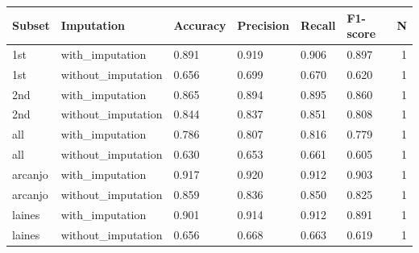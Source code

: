 \begin{tabular}{llllllr}
\toprule
 Subset &         Imputation & Accuracy & Precision & Recall & F1-score &  N \\
\midrule
    1st &    with_imputation &    0.891 &     0.919 &  0.906 &    0.897 &  1 \\
    1st & without_imputation &    0.656 &     0.699 &  0.670 &    0.620 &  1 \\
    2nd &    with_imputation &    0.865 &     0.894 &  0.895 &    0.860 &  1 \\
    2nd & without_imputation &    0.844 &     0.837 &  0.851 &    0.808 &  1 \\
    all &    with_imputation &    0.786 &     0.807 &  0.816 &    0.779 &  1 \\
    all & without_imputation &    0.630 &     0.653 &  0.661 &    0.605 &  1 \\
arcanjo &    with_imputation &    0.917 &     0.920 &  0.912 &    0.903 &  1 \\
arcanjo & without_imputation &    0.859 &     0.836 &  0.850 &    0.825 &  1 \\
 laines &    with_imputation &    0.901 &     0.914 &  0.912 &    0.891 &  1 \\
 laines & without_imputation &    0.656 &     0.668 &  0.663 &    0.619 &  1 \\
\bottomrule
\end{tabular}
